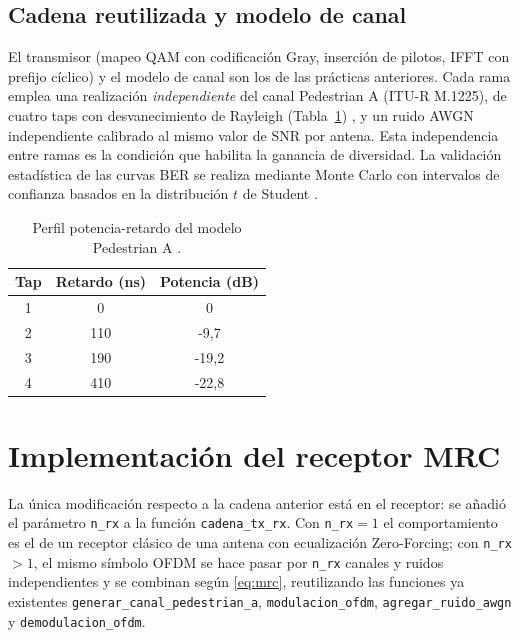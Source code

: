 \documentclass[conference,onecolumn]{IEEEtran}
\begin{document}
\subsection{Cadena reutilizada y modelo de canal}

El transmisor (mapeo QAM con codificaci\'on Gray, inserci\'on de pilotos, IFFT con prefijo c\'iclico) y el modelo de canal son los de las pr\'acticas anteriores. Cada rama emplea una realizaci\'on \emph{independiente} del canal Pedestrian A (ITU-R M.1225), de cuatro taps con desvanecimiento de Rayleigh (Tabla~\ref{tab:pedA}) \cite{ituR1225,rappaport2002}, y un ruido AWGN independiente calibrado al mismo valor de SNR por antena. Esta independencia entre ramas es la condici\'on que habilita la ganancia de diversidad. La validaci\'on estad\'istica de las curvas BER se realiza mediante Monte Carlo con intervalos de confianza basados en la distribuci\'on $t$ de Student \cite{montgomery2011}.

\begin{table}[H]
    \renewcommand{\arraystretch}{1.2}
    \caption{Perfil potencia-retardo del modelo Pedestrian A \cite{ituR1225}.}
    \label{tab:pedA}
    \centering
    \begin{tabular}{ccc}
        \hline
        \textbf{Tap} & \textbf{Retardo (ns)} & \textbf{Potencia (dB)} \\
        \hline
        1 & 0   & 0       \\
        2 & 110 & -9{,}7  \\
        3 & 190 & -19{,}2 \\
        4 & 410 & -22{,}8 \\
        \hline
    \end{tabular}
\end{table}

\section{Implementaci\'on del receptor MRC}

La \'unica modificaci\'on respecto a la cadena anterior est\'a en el receptor: se a\~nadi\'o el par\'ametro \texttt{n\_rx} a la funci\'on \texttt{cadena\_tx\_rx}. Con \texttt{n\_rx}${=}1$ el comportamiento es el de un receptor cl\'asico de una antena con ecualizaci\'on Zero-Forcing; con \texttt{n\_rx}${>}1$, el mismo s\'imbolo OFDM se hace pasar por \texttt{n\_rx} canales y ruidos independientes y se combinan seg\'un \eqref{eq:mrc}, reutilizando las funciones ya existentes \texttt{generar\_canal\_pedestrian\_a}, \texttt{modulacion\_ofdm}, \texttt{agregar\_ruido\_awgn} y \texttt{demodulacion\_ofdm}.
\end{document}
